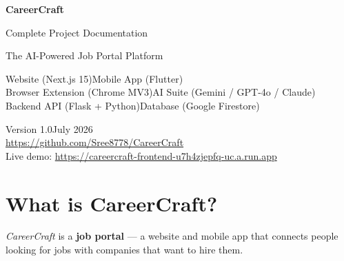 \documentclass[12pt, a4paper]{report}
\newcommand{\cc}{\textit{CareerCraft}}
\begin{document}
\begin{titlepage}
  \pagecolor{ccpurple}
  \color{white}
  \centering
  \vspace*{3cm}

  {\fontsize{58}{66}\selectfont\bfseries CareerCraft}

  \vspace{0.8cm}
  {\LARGE Complete Project Documentation}

  \vspace{0.4cm}
  \textcolor{ccpurplelt}{\large The AI-Powered Job Portal Platform}

  \vspace{2.5cm}

  \begin{tcolorbox}[
    colback  = white!15!ccpurple,
    colframe = white,
    width    = 12cm,
    arc      = 8pt,
    boxrule  = 1pt,
  ]
    \centering\color{white}\small
    Website (Next.js 15)\quad\textbullet\quad Mobile App (Flutter)\\[4pt]
    Browser Extension (Chrome MV3)\quad\textbullet\quad AI Suite (Gemini / GPT-4o / Claude)\\[4pt]
    Backend API (Flask + Python)\quad\textbullet\quad Database (Google Firestore)
  \end{tcolorbox}

  \vfill

  \textcolor{ccpurplelt}{\small Version 1.0\quad\textbullet\quad July 2026}\\[4pt]
  \textcolor{ccpurplelt}{\small\url{https://github.com/Sree8778/CareerCraft}}\\[4pt]
  \textcolor{ccpurplelt}{\small Live demo: \url{https://careercraft-frontend-u7h4zjepfq-uc.a.run.app}}

\end{titlepage}

\nopagecolor
\color{black}

\tableofcontents
\clearpage

\chapter{What is CareerCraft?}

\cc{} is a \textbf{job portal} --- a website and mobile app that connects people
looking for jobs with companies that want to hire them.
\end{document}
